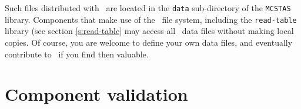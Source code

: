 Such files distributed with \MCS\ are located in the \verb+data+ sub-directory of the \verb+MCSTAS+ library. Components that make use of the \MCS\ file system, including the \verb+read-table+ library (see section \ref{s:read-table} may access all \MCS\ data files without making local copies. Of course, you are welcome to define your own data files, and eventually contribute to \MCS\ if you find then valuable.


\section{Component validation}

